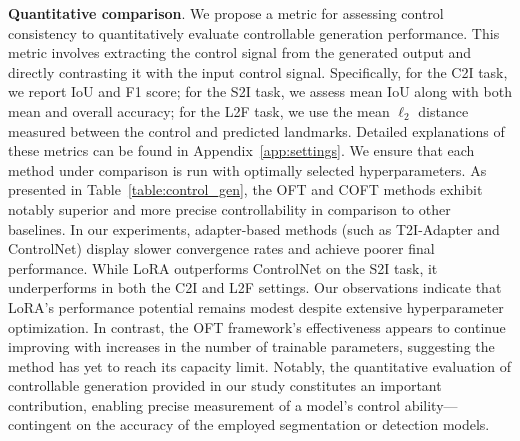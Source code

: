 {\textbf{Quantitative comparison}. We propose a metric for assessing control consistency to quantitatively evaluate controllable generation performance. This metric involves extracting the control signal from the generated output and directly contrasting it with the input control signal. Specifically, for the C2I task, we report IoU and F1 score; for the S2I task, we assess mean IoU along with both mean and overall accuracy; for the L2F task, we use the mean $\ell_2$ distance measured between the control and predicted landmarks. Detailed explanations of these metrics can be found in Appendix~\ref{app:settings}. We ensure that each method under comparison is run with optimally selected hyperparameters. As presented in Table~\ref{table:control_gen}, the OFT and COFT methods exhibit notably superior and more precise controllability in comparison to other baselines. In our experiments, adapter-based methods (such as T2I-Adapter and ControlNet) display slower convergence rates and achieve poorer final performance. While LoRA outperforms ControlNet on the S2I task, it underperforms in both the C2I and L2F settings. Our observations indicate that LoRA’s performance potential remains modest despite extensive hyperparameter optimization. In contrast, the OFT framework’s effectiveness appears to continue improving with increases in the number of trainable parameters, suggesting the method has yet to reach its capacity limit. Notably, the quantitative evaluation of controllable generation provided in our study constitutes an important contribution, enabling precise measurement of a model’s control ability—contingent on the accuracy of the employed segmentation or detection models.

}
